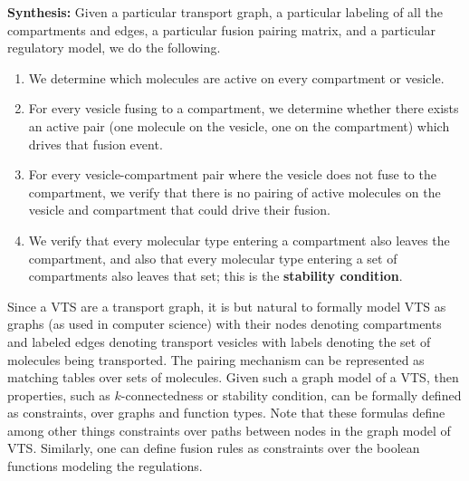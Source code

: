 \textbf{Synthesis:} Given a particular transport graph, a particular labeling of all the compartments and edges, a particular fusion pairing matrix, and a particular regulatory model, we do the following.

\begin{enumerate}
\item We determine which molecules are active on every compartment or vesicle.
\item For every vesicle fusing to a compartment, we determine whether there exists an active pair (one molecule on the vesicle, one on the compartment) which drives that fusion event.
\item For every vesicle-compartment pair where the vesicle does not fuse to the compartment, we verify that there is no pairing of active molecules on the
vesicle and compartment that could drive their fusion.
\item We verify that every molecular type entering a compartment also leaves the compartment, and also that every molecular type entering a set of compartments also leaves that set; this is the \textbf{stability condition}.
\end{enumerate}


\label{subsec:graphmodel}
Since a VTS are a transport graph, it is but natural to formally model VTS as graphs (as used in computer science) with their nodes denoting compartments and labeled edges denoting transport vesicles with labels denoting the set of molecules being transported. The pairing mechanism can be represented as matching tables over sets of molecules.
Given such a graph model of a VTS, then properties, such as $k$-connectedness or stability condition, can be formally defined as constraints, 
over graphs and function types.  Note that these formulas define among other things constraints over paths between nodes in the graph model of VTS. Similarly, one can define fusion rules as constraints over the boolean functions modeling the regulations.  
   
